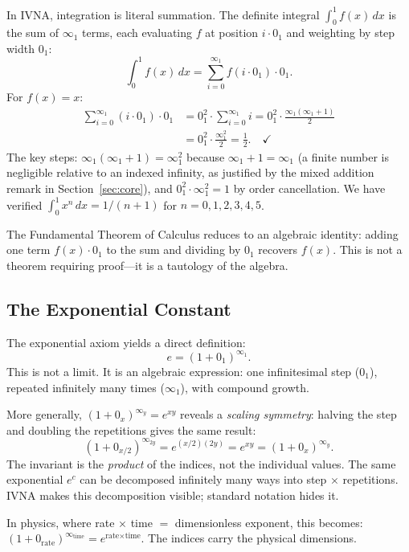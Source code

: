 \documentclass[12pt]{article}
\theoremstyle{definition}
\theoremstyle{remark}
\newcommand{\vz}[1]{0_{#1}}             %
\newcommand{\vi}[1]{\infty_{#1}}        %
\newcommand{\vzn}[2]{0^{#1}_{#2}}       %
\newcommand{\vin}[2]{\infty^{#1}_{#2}}  %
\begin{document}
In IVNA, integration is literal summation. The definite integral
$\int_0^1 f(x)\,dx$ is the sum of $\vi{1}$ terms, each evaluating
$f$ at position $i \cdot \vz{1}$ and weighting by step width $\vz{1}$:
\[
\int_0^1 f(x)\,dx = \sum_{i=0}^{\vi{1}} f(i \cdot \vz{1}) \cdot \vz{1}.
\]
For $f(x) = x$:
\begin{align*}
\sum_{i=0}^{\vi{1}} (i \cdot \vz{1}) \cdot \vz{1}
&= \vzn{2}{1} \cdot \sum_{i=0}^{\vi{1}} i
= \vzn{2}{1} \cdot \frac{\vi{1}(\vi{1}+1)}{2} \\
&= \vzn{2}{1} \cdot \frac{\vin{2}{1}}{2}
= \frac{1}{2}. \quad\checkmark
\end{align*}
The key steps: $\vi{1}(\vi{1}+1) = \vin{2}{1}$ because $\vi{1} + 1 = \vi{1}$
(a finite number is negligible relative to an indexed infinity, as justified
by the mixed addition remark in Section~\ref{sec:core}), and
$\vzn{2}{1} \cdot \vin{2}{1} = 1$ by order cancellation.
We have verified $\int_0^1 x^n\,dx = 1/(n+1)$ for $n = 0, 1, 2, 3, 4, 5$.

The Fundamental Theorem of Calculus reduces to an algebraic identity:
adding one term $f(x) \cdot \vz{1}$ to the sum and dividing by $\vz{1}$
recovers $f(x)$. This is not a theorem requiring proof---it is a
tautology of the algebra.

\subsection{The Exponential Constant}

The exponential axiom yields a direct definition:
\[
e = (1 + \vz{1})^{\vi{1}}.
\]
This is not a limit. It is an algebraic expression: one infinitesimal
step ($\vz{1}$), repeated infinitely many times ($\vi{1}$), with
compound growth.

More generally, $(1 + \vz{x})^{\vi{y}} = e^{xy}$ reveals a
\emph{scaling symmetry}: halving the step and doubling the repetitions
gives the same result:
\[
(1 + \vz{x/2})^{\vi{2y}} = e^{(x/2)(2y)} = e^{xy}
= (1 + \vz{x})^{\vi{y}}.
\]
The invariant is the \emph{product} of the indices, not the individual
values. The same exponential $e^c$ can be decomposed infinitely many
ways into step $\times$ repetitions. IVNA makes this decomposition
visible; standard notation hides it.

In physics, where rate $\times$ time $=$ dimensionless exponent,
this becomes: $(1 + \vz{\text{rate}})^{\vi{\text{time}}} =
e^{\text{rate} \times \text{time}}$. The indices carry the physical
dimensions.
\end{document}
